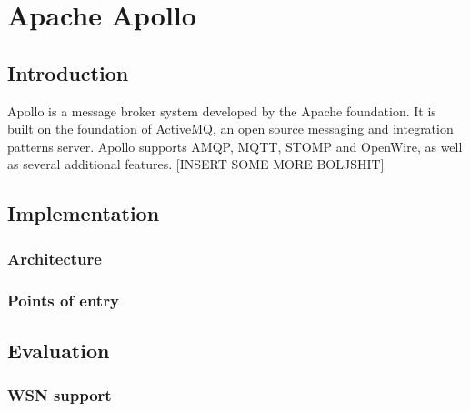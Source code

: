 \chapter{Apache Apollo}

\section{Introduction}

Apollo is a message broker system developed by the Apache foundation. It is built on the foundation of ActiveMQ, an open source messaging and integration patterns server. Apollo supports AMQP, MQTT, STOMP and OpenWire, as well as several additional features. [INSERT SOME MORE BOLJSHIT]

\section{Implementation}

\subsection{Architecture}

\subsection{Points of entry}


\section{Evaluation}

\subsection{WSN support}

\clearpage
